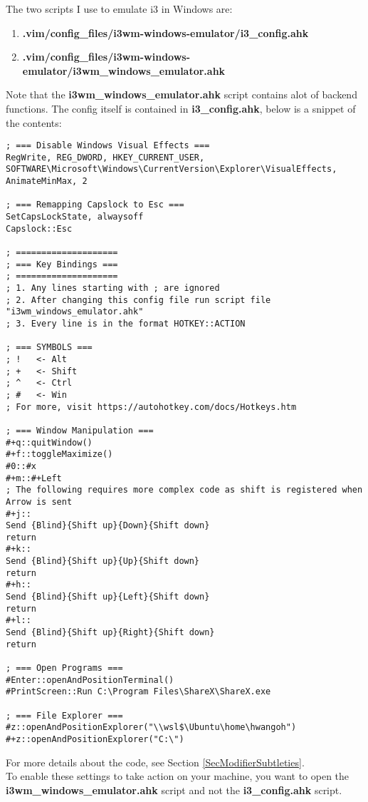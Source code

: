 The two scripts I use to emulate i3 in Windows are:
\begin{enumerate}
    \item \textbf{.vim/config\_files/i3wm-windows-emulator/i3\_config.ahk}
    \item \textbf{.vim/config\_files/i3wm-windows-emulator/i3wm\_windows\_emulator.ahk}
\end{enumerate}
Note that the \textbf{i3wm\_windows\_emulator.ahk} script contains alot of
backend functions. The config itself is contained in \textbf{i3\_config.ahk},
below is a snippet of the contents:
\begin{lstlisting}
; === Disable Windows Visual Effects ===
RegWrite, REG_DWORD, HKEY_CURRENT_USER, SOFTWARE\Microsoft\Windows\CurrentVersion\Explorer\VisualEffects, AnimateMinMax, 2

; === Remapping Capslock to Esc ===
SetCapsLockState, alwaysoff
Capslock::Esc

; ====================
; === Key Bindings ===
; ====================
; 1. Any lines starting with ; are ignored
; 2. After changing this config file run script file "i3wm_windows_emulator.ahk"
; 3. Every line is in the format HOTKEY::ACTION

; === SYMBOLS ===
; !   <- Alt
; +   <- Shift
; ^   <- Ctrl
; #   <- Win
; For more, visit https://autohotkey.com/docs/Hotkeys.htm

; === Window Manipulation ===
#+q::quitWindow()
#+f::toggleMaximize()
#0::#x
#+m::#+Left
; The following requires more complex code as shift is registered when Arrow is sent
#+j::
Send {Blind}{Shift up}{Down}{Shift down}
return
#+k::
Send {Blind}{Shift up}{Up}{Shift down}
return
#+h::
Send {Blind}{Shift up}{Left}{Shift down}
return
#+l::
Send {Blind}{Shift up}{Right}{Shift down}
return

; === Open Programs ===
#Enter::openAndPositionTerminal()
#PrintScreen::Run C:\Program Files\ShareX\ShareX.exe

; === File Explorer ===
#z::openAndPositionExplorer("\\wsl$\Ubuntu\home\hwangoh")
#+z::openAndPositionExplorer("C:\")
\end{lstlisting}
For more details about the code, see Section \ref{SecModifierSubtleties}.\\

To enable these settings to take action on your machine, you want to open the
\textbf{i3wm\_windows\_emulator.ahk} script and not the \textbf{i3\_config.ahk}
script.

